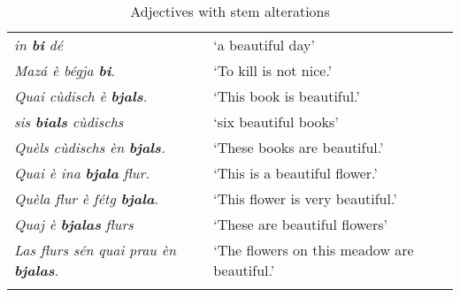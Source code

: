 \begin{table}\
\caption{Adjectives with stem alterations}
\label{tab:adj:stemalterations}
 \begin{tabular}{ll}
  \lsptoprule
    \textit{in \textbf{bi} dé} & `a beautiful day'\\
\textit{Mazá è bégja \textbf{bi}}. &`To kill is not nice.'\\
\textit{Quai cùdisch è} \textbf{\textit{bjals}}\textit{.} & `This book is beautiful.'\\
\textit{sis \textbf{bials} cùdischs} & `six beautiful books'\\
\textit{Quèls cùdischs èn} \textbf{\textit{bjals}}\textit{.} & `These books are beautiful.'\\
\textit{Quai è ina} \textbf{\textit{bjala}} \textit{flur.} & `This is a beautiful flower.'\\
\textit{Quèla flur è fétg \textbf{bjala}. }&`This flower is very beautiful.'\\
\textit{Quaj è} \textbf{\textit{bjalas}} \textit{flurs} & `These are beautiful flowers'\\
\textit{Las flurs sén quai prau èn \textbf{bjalas}}. &`The flowers on this meadow are beautiful.'\\
  \lspbottomrule
 \end{tabular}
\end{table}


